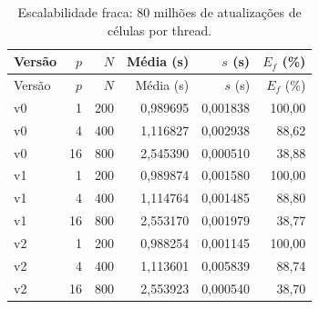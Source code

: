 \begin{longtable}{lrrrrr}
\caption{Escalabilidade fraca: 80 milhões de atualizações de células por thread.}\label{tab:fraca}\\
\toprule Versão & $p$ & $N$ & Média (s) & $s$ (s) & $E_f$ (\%)\\
\midrule\endfirsthead
\toprule Versão & $p$ & $N$ & Média (s) & $s$ (s) & $E_f$ (\%)\\
\midrule\endhead
\bottomrule\endfoot
v0 & 1 & 200 & 0,989695 & 0,001838 & 100,00\\
v0 & 4 & 400 & 1,116827 & 0,002938 & 88,62\\
v0 & 16 & 800 & 2,545390 & 0,000510 & 38,88\\
v1 & 1 & 200 & 0,989874 & 0,001580 & 100,00\\
v1 & 4 & 400 & 1,114764 & 0,001485 & 88,80\\
v1 & 16 & 800 & 2,553170 & 0,001979 & 38,77\\
v2 & 1 & 200 & 0,988254 & 0,001145 & 100,00\\
v2 & 4 & 400 & 1,113601 & 0,005839 & 88,74\\
v2 & 16 & 800 & 2,553923 & 0,000540 & 38,70\\
\end{longtable}
